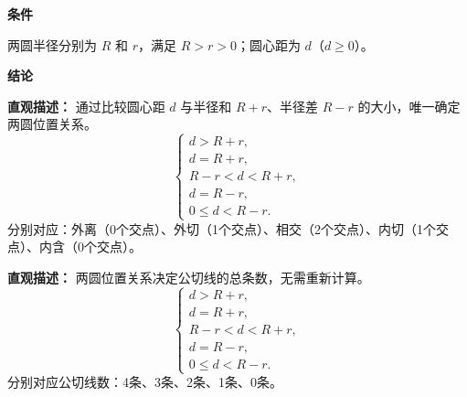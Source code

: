 \begin{statementbox}
	\textbf{\textcolor{CStatement}{条件}}
	\begin{description}[style=nextline, leftmargin=2.8em, labelsep=0.5em, itemsep=0.35em]
		\item[\textbf{\textcolor{CStatement}{条件1（半径圆心距）：}}]
			两圆半径分别为 $R$ 和 $r$，满足 $R > r > 0$；圆心距为 $d$（$d \ge 0$）。
	\end{description}
	\textbf{\textcolor{CStatement}{结论}}
	\begin{description}[style=nextline, leftmargin=2.8em, labelsep=0.5em, itemsep=0.45em]
		\item[\textbf{\textcolor{CStatement}{结论一（位置关系判定）：}}]
			\textbf{\textcolor{CStatement}{直观描述：}}
			通过比较圆心距 $d$ 与半径和 $R+r$、半径差 $R-r$ 的大小，唯一确定两圆位置关系。
			\[
				\begin{cases}
					d > R + r,\\ d = R + r,\\ R - r < d < R + r,\\ d = R - r,\\ 0 \le d < R - r.
			\end{cases}
			\]
			分别对应：外离（0个交点）、外切（1个交点）、相交（2个交点）、内切（1个交点）、内含（0个交点）。
		\item[\textbf{\textcolor{CStatement}{推广结论（公切线数量）：}}]
			\textbf{\textcolor{CStatement}{直观描述：}}
			两圆位置关系决定公切线的总条数，无需重新计算。
			\[
				\begin{cases}
					d > R + r,\\ d = R + r,\\ R - r < d < R + r,\\ d = R - r,\\ 0 \le d < R - r.
			\end{cases}
			\]
			分别对应公切线数：4条、3条、2条、1条、0条。
	\end{description}

\end{statementbox}
